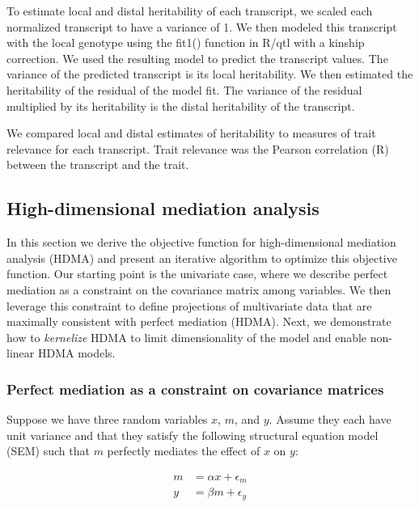 \documentclass[
]{article}
\begin{document}
To estimate local and distal heritability of each transcript, we scaled
each normalized transcript to have a variance of 1. We then modeled this
transcript with the local genotype using the fit1() function in R/qtl
with a kinship correction. We used the resulting model to predict the
transcript values. The variance of the predicted transcript is its local
heritability. We then estimated the heritability of the residual of the
model fit. The variance of the residual multiplied by its heritability
is the distal heritability of the transcript.

We compared local and distal estimates of heritability to measures of
trait relevance for each transcript. Trait relevance was the Pearson
correlation (R) between the transcript and the trait.

\subsection{High-dimensional mediation
analysis}\label{high-dimensional-mediation-analysis}

In this section we derive the objective function for high-dimensional
mediation analysis (HDMA) and present an iterative algorithm to optimize
this objective function. Our starting point is the univariate case,
where we describe perfect mediation as a constraint on the covariance
matrix among variables. We then leverage this constraint to define
projections of multivariate data that are maximally consistent with
perfect mediation (HDMA). Next, we demonstrate how to \textit{kernelize}
HDMA to limit dimensionality of the model and enable non-linear HDMA
models.

\subsubsection{Perfect mediation as a constraint on covariance
matrices}\label{perfect-mediation-as-a-constraint-on-covariance-matrices}

Suppose we have three random variables \(x\), \(m\), and \(y\). Assume
they each have unit variance and that they satisfy the following
structural equation model (SEM) such that \(m\) perfectly mediates the
effect of \(x\) on \(y\):

\begin{align}
m &= \alpha x + \epsilon_m \label{eqn:perfect_mediation1}\\ 
y &= \beta m + \epsilon_y  \label{eqn:perfect_mediation2}
\end{align}
\end{document}
